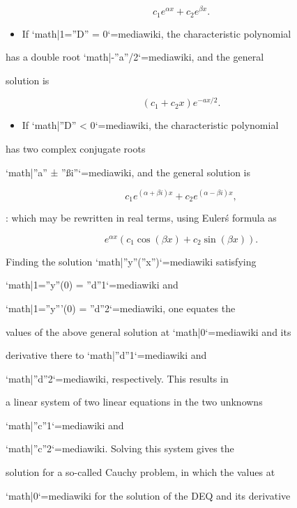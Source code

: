 $$c_1 e^{\alpha x} + c_2 e^{\beta x}.$$



\begin{itemize}
    \item If `{{math|1=''D'' = 0}}`{=mediawiki}, the characteristic polynomial
\end{itemize}
    has a double root `{{math|-''a''/2}}`{=mediawiki}, and the general

    solution is



$$(c_1 + c_2 x) e^{-ax/2}.$$



\begin{itemize}
    \item If `{{math|''D'' < 0}}`{=mediawiki}, the characteristic polynomial
\end{itemize}
    has two complex conjugate roots

    `{{math|''a'' ± ''ßi''}}`{=mediawiki}, and the general solution is



$$c_1 e^{(\alpha + \beta i)x} + c_2 e^{(\alpha - \beta i)x},$$



:   which may be rewritten in real terms, using Euler\'s formula as

    $$e^{\alpha x}  (c_1\cos(\beta x) + c_2 \sin(\beta x)).$$



Finding the solution `{{math|''y''(''x'')}}`{=mediawiki} satisfying

`{{math|1=''y''(0) = ''d''1}}`{=mediawiki} and

`{{math|1=''y'''(0) = ''d''2}}`{=mediawiki}, one equates the

values of the above general solution at `{{math|0}}`{=mediawiki} and its

derivative there to `{{math|''d''1}}`{=mediawiki} and

`{{math|''d''2}}`{=mediawiki}, respectively. This results in

a linear system of two linear equations in the two unknowns

`{{math|''c''1}}`{=mediawiki} and

`{{math|''c''2}}`{=mediawiki}. Solving this system gives the

solution for a so-called Cauchy problem, in which the values at

`{{math|0}}`{=mediawiki} for the solution of the DEQ and its derivative

